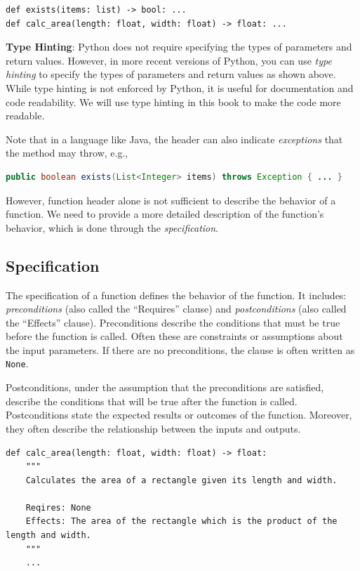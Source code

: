 \documentclass[oneside,11pt,dvipsnames]{book}
\newenvironment{commentbox}[1][]{
  \small
  \begin{mybox}
    {\small \textbf{#1}}
  }{
  \end{mybox}
}
\newcommand{\code}[1]{\texttt{#1}}
\begin{document}
\begin{lstlisting}
def exists(items: list) -> bool: ...
def calc_area(length: float, width: float) -> float: ...
\end{lstlisting}


\begin{commentbox}{\textbf{Type Hinting}: }
    Python does not require specifying the types of parameters and return values. However, in more recent versions of Python, you can use \emph{type hinting} to specify the types of parameters and return values as shown above. While type hinting is not enforced by Python, it is useful for documentation and code readability. We will use type hinting in this book to make the code more readable. 
\end{commentbox}


Note that in a language like Java, the header can also indicate \emph{exceptions} that the method may throw, e.g., 

\begin{lstlisting}[language=Java]
public boolean exists(List<Integer> items) throws Exception { ... }
\end{lstlisting}

However, function header alone is not sufficient to describe the behavior of a function. We need to provide a more detailed description of the function's behavior, which is done through the \emph{specification}.

\subsection{Specification}

The specification of a function defines the behavior of the function.  It includes: \emph{preconditions} (also called the ``Requires'' clause) and \emph{postconditions} (also called the ``Effects'' clause). Preconditions describe the conditions that must be true before the function is called. Often these are constraints or assumptions about the input parameters. If there are no preconditions, the clause is often written as \code{None}.

Postconditions, under the assumption that the preconditions are satisfied, describe the conditions that will be true after the function is called. Postconditions state the expected results or outcomes of the function. Moreover, they often describe the relationship between the inputs and outputs.


\begin{lstlisting}
def calc_area(length: float, width: float) -> float:
    """
    Calculates the area of a rectangle given its length and width.

    Reqires: None
    Effects: The area of the rectangle which is the product of the length and width.
    """
    ...
\end{lstlisting}
\end{document}
